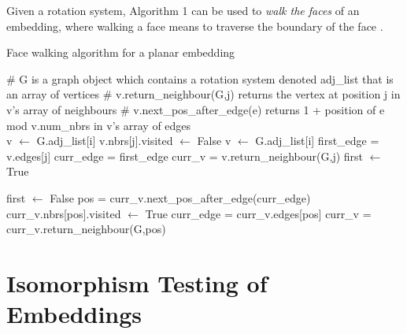 \documentclass[12pt]{article}
\begin{document}
Given a rotation system, Algorithm 1 can be used to \textit{walk the faces} of an embedding, where walking a face means to traverse the boundary of the face \cite{WM3}.

\begin{algorithm}[H]
\caption{Face walking algorithm for a planar embedding}\label{euclid}
\begin{algorithmic}[1]
\scriptsize
{}
    \State \# G is a graph object which contains a rotation system denoted adj\_list that is an array of vertices
    \State \# v.return\_neighbour(G,j) returns the vertex at position j in v's array of neighbours
    \State \# v.next\_pos\_after\_edge(e) returns 1 + position of e mod v.num\_nbrs in v's array of edges \\

        \State v $\gets$ G.adj\_list[i]
            \State v.nbrs[j].visited $\gets$ False
        \EndFor
    \EndFor
        \State v $\gets$ G.adj\_list[i]
                \State first\_edge = v.edges[j]
                \State curr\_edge = first\_edge
                \State curr\_v = v.return\_neighbour(G,j)
                \State first $\gets$ True

\end{algorithmic}
\end{algorithm}
 
\begin{algorithm}[H]
\begin{algorithmic}[1]
\scriptsize    
                    \State first $\gets$ False
                    \State pos = curr\_v.next\_pos\_after\_edge(curr\_edge)
                    \State curr\_v.nbrs[pos].visited $\gets$ True
                    \State curr\_edge = curr\_v.edges[pos]
                    \State curr\_v = curr\_v.return\_neighbour(G,pos)
                \EndWhile    
            \EndIf
        \EndFor
    \EndFor
\EndProcedure
\end{algorithmic}
\end{algorithm}

\section{Isomorphism Testing of Embeddings}
\end{document}
